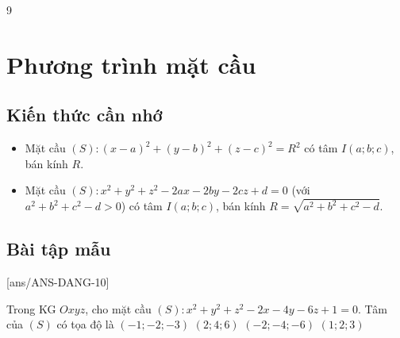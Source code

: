 \setcounter {section} {9}
\setcounter{ex}{0}
\section{Phương trình mặt cầu}
\subsection{Kiến thức cần nhớ}
\begin{khung}
	\begin{itemize}
		\item Mặt cầu $(S)\colon (x-a)^2+(y-b)^2+(z-c)^2=R^2$ có tâm $I(a;b;c)$, bán kính $R$.
		\item Mặt cầu $(S)\colon x^2+y^2+z^2-2ax-2by-2cz+d=0$ (với $a^2+b^2+c^2-d>0$) có tâm $I(a;b;c)$, bán kính $R=\sqrt{a^2+b^2+c^2-d}$.
	\end{itemize}
\end{khung}
\subsection{Bài tập mẫu}
[ans/ANS-DANG-10]
\begin{khung}
	\begin{vd}%
		Trong KG $Oxyz$, cho mặt cầu $(S) \colon x^2+y^2+z^2-2x-4y-6z+1=0$. Tâm của $(S)$ có tọa độ là
		\choice
		{$(-1;-2;-3)$}
		{$(2;4;6)$}
		{$(-2;-4;-6)$}
		{\True $(1;2;3)$}
	\end{vd}
\end{khung}
